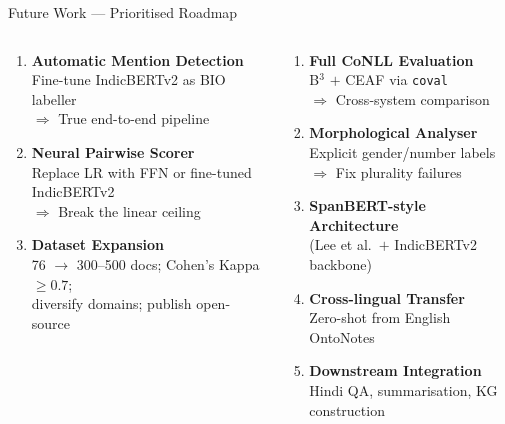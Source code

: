 \documentclass[aspectratio=169]{beamer}
\begin{document}
\begin{frame}{Future Work — Prioritised Roadmap}
  \begin{columns}[T]
      \begin{tcolorbox}[nbox={High Priority}]
        \small
        \begin{enumerate}\setlength\itemsep{5pt}
          \item \textbf{Automatic Mention Detection}\\
                Fine-tune IndicBERTv2 as BIO labeller\\
                $\Rightarrow$ True end-to-end pipeline
          \item \textbf{Neural Pairwise Scorer}\\
                Replace LR with FFN or fine-tuned IndicBERTv2\\
                $\Rightarrow$ Break the linear ceiling
          \item \textbf{Dataset Expansion}\\
                76 $\to$ 300–500 docs; Cohen's Kappa ${\geq}0.7$;\\
                diversify domains; publish open-source
        \end{enumerate}
      \end{tcolorbox}

      \begin{tcolorbox}[nbox={Medium \& Long-Term}]
        \small
        \begin{enumerate}\setlength\itemsep{5pt}
          \setcounter{enumi}{3}
          \item \textbf{Full CoNLL Evaluation}\\
                B$^3$ $+$ CEAF via \texttt{coval}\\
                $\Rightarrow$ Cross-system comparison
          \item \textbf{Morphological Analyser}\\
                Explicit gender/number labels\\
                $\Rightarrow$ Fix plurality failures
          \item \textbf{SpanBERT-style Architecture}\\
                (Lee et al.\ $+$ IndicBERTv2 backbone)
          \item \textbf{Cross-lingual Transfer}\\
                Zero-shot from English OntoNotes
          \item \textbf{Downstream Integration}\\
                Hindi QA, summarisation, KG construction
        \end{enumerate}
      \end{tcolorbox}
  \end{columns}
\end{frame}
\end{document}
